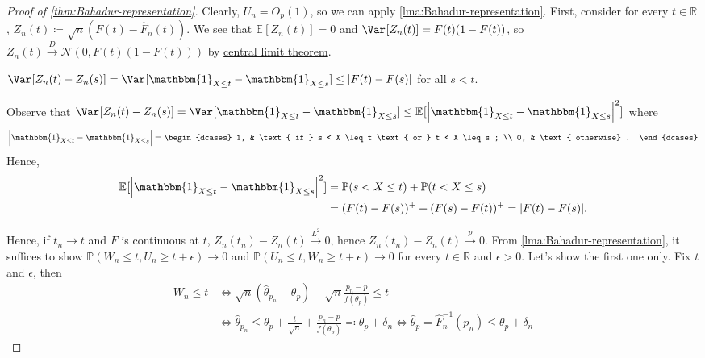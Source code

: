 \begin{proof}[Proof of \autoref{thm:Bahadur-representation}]
	Clearly, \(U_n = O_p(1)\), so we can apply \autoref{lma:Bahadur-representation}. First, consider for every \(t \in \mathbb{R} \), \(Z_n(t) \coloneqq \sqrt{n} (F(t) - \hat{F} _n(t))\). We see that \(\mathbb{E}_{}[Z_n(t)] = 0\) and \(\Var_{}[Z_n(t)] = F(t) (1 - F(t))\), so \(Z_n(t) \overset{D}{\to} \mathcal{N} (0, F(t) (1 - F(t)))\) by \hyperref[thm:CLT]{central limit theorem}.

	\begin{claim}
		\(\Var_{}[Z_n(t) - Z_n(s)] = \Var_{}[\mathbbm{1}_{X \leq t} - \mathbbm{1}_{X \leq s} ] \leq \vert F(t) - F(s) \vert \) for all \(s < t\).
	\end{claim}
	\begin{explanation}
		Observe that \(\Var_{}[Z_n(t) - Z_n(s)] = \Var_{}[\mathbbm{1}_{X \leq t} - \mathbbm{1}_{X \leq s} ] \leq \mathbb{E}_{}[\left\vert \mathbbm{1}_{X \leq t} - \mathbbm{1}_{X \leq s} \right\vert ^2 ]\) where
		\[
			\left\vert \mathbbm{1}_{X \leq t} - \mathbbm{1}_{X \leq s} \right\vert
			= \begin{dcases}
				1, & \text{ if } s < X \leq t \text{ or } t < X \leq s ; \\
				0, & \text{ otherwise} .
			\end{dcases}
		\]
		Hence,
		\[
			\begin{split}
				\mathbb{E}_{}[\left\vert \mathbbm{1}_{X \leq t} - \mathbbm{1}_{X \leq s} \right\vert ^2 ]
				 & = \mathbb{P} (s < X \leq t) + \mathbb{P} (t < X \leq s) \\
				 & = (F(t) - F(s))^+ + (F(s) - F(t))^+
				= \vert F(t) - F(s) \vert.
			\end{split}
		\]
	\end{explanation}
	Hence, if \(t_n \to t\) and \(F\) is continuous at \(t\), \(Z_n(t_n) - Z_n(t) \overset{L^2}{\to} 0\), hence \(Z_n(t_n) - Z_n(t) \overset{p}{\to} 0\). From \autoref{lma:Bahadur-representation}, it suffices to show \(\mathbb{P} (W_n \leq t, U_n \geq t + \epsilon ) \to 0\) and \(\mathbb{P} (U_n \leq t , W_n \geq t+\epsilon ) \to 0\) for every \(t \in \mathbb{R} \) and \(\epsilon > 0\). Let's show the first one only. Fix \(t\) and \(\epsilon \), then
	\[
		\begin{split}
			W_n \leq t
			 & \iff \sqrt{n} (\hat{\theta} _{p_n} - \theta _p) - \sqrt{n} \frac{p_n - p}{f(\theta _p)} \leq t                               \\
			 & \iff \hat{\theta} _{p_n} \leq \theta _p + \frac{t}{\sqrt{n} } + \frac{p_n - p}{f(\theta _p)} \eqqcolon \theta _p + \delta _n
			\iff \hat{\theta} _p = \hat{F} _n^{-1} (p_n) \leq \theta _p + \delta _n

\end{split}\]
\end{proof}
